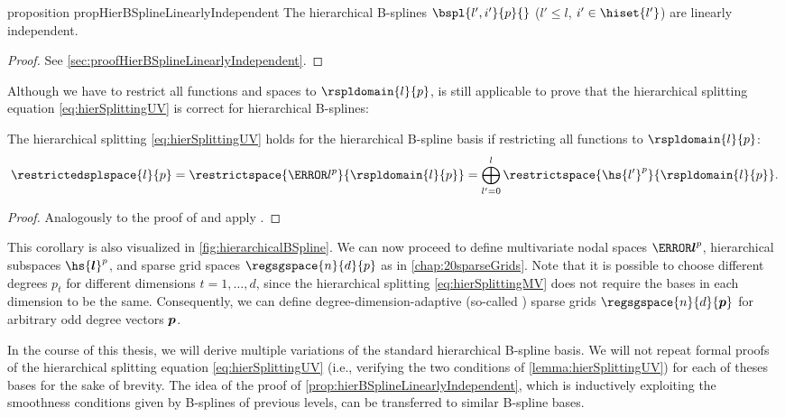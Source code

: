 \begin{restatable}{%
  proposition%
}{%
  propHierBSplineLinearlyIndependent%
}
  \label{prop:hierBSplineLinearlyIndependent}
  The hierarchical B-splines
  $\bspl{l',i'}{p}{}$ ($l' \le l$, $i' \in \hiset{l'}$)
  are linearly independent.
\end{restatable}

\begin{proof}
  See \cref{sec:proofHierBSplineLinearlyIndependent}.
\end{proof}

Although we have to restrict all functions and spaces to $\rspldomain{l}{p}$,
 is still applicable to prove that
the hierarchical splitting equation \eqref{eq:hierSplittingUV}
is correct for hierarchical B-splines:

\begin{corollary}
  \label{cor:hierSplittingBSpline}
  The hierarchical splitting \eqref{eq:hierSplittingUV}
  holds for the hierarchical B-spline basis
  if restricting all functions to $\rspldomain{l}{p}$:
  \begin{equation}
    \restrictedsplspace{l}{p}
    = \restrictspace{\ns{l}^p}{\rspldomain{l}{p}}
    = \bigoplus_{l'=0}^l \restrictspace{\hs{l'}^p}{\rspldomain{l}{p}}.
  \end{equation}
\end{corollary}

\begin{proof}
  Analogously to the proof of 
  and apply .
\end{proof}

This corollary is also visualized in \cref{fig:hierarchicalBSpline}.
We can now proceed to define multivariate
nodal spaces $\ns{\*l}^p$, hierarchical subspaces $\hs{\*l}^p$, and
sparse grid spaces $\regsgspace{n}{d}{p}$ as in \cref{chap:20sparseGrids}.
Note that it is possible to choose different degrees $p_t$ for
different dimensions $t = 1, \dotsc, d$,
since the hierarchical splitting \eqref{eq:hierSplittingMV} does not
require the bases in each dimension to be the same.
Consequently, we can define degree-dimension-adaptive
(so-called ) sparse grids
$\regsgspace{n}{d}{\*p}$ for arbitrary odd degree vectors ${\boldsymbol{p}}$.

In the course of this thesis, we will derive multiple variations
of the standard hierarchical B-spline basis.
We will not repeat formal proofs of the hierarchical splitting equation
\eqref{eq:hierSplittingUV}
(i.e., verifying the two conditions of \cref{lemma:hierSplittingUV})
for each of theses bases for the sake of brevity.
The idea of the proof of \cref{prop:hierBSplineLinearlyIndependent},
which is inductively exploiting the smoothness conditions given by
B-splines of previous levels, can be transferred to similar B-spline
bases.



